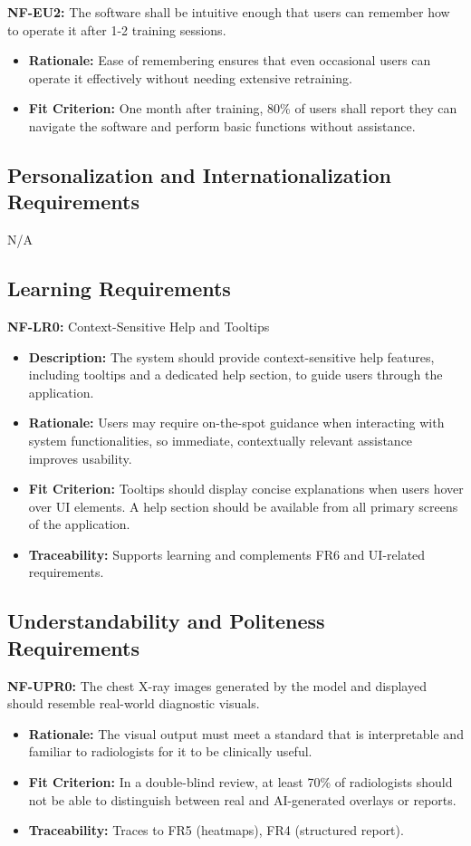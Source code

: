\documentclass[12pt]{article}
\begin{document}
\textbf{NF-EU2:} The software shall be intuitive enough that users can remember how to operate it after 1-2 training sessions.
\begin{itemize}
    \item \textbf{Rationale:} Ease of remembering ensures that even occasional users can operate it effectively without needing extensive retraining.
    \item \textbf{Fit Criterion:} One month after training, 80\% of users shall report they can navigate the software and perform basic functions without assistance.
\end{itemize}

\subsection{Personalization and Internationalization Requirements}
N/A

\subsection{Learning Requirements}

\textbf{NF-LR0:} Context-Sensitive Help and Tooltips
\begin{itemize}
    \item \textbf{Description:} The system should provide context-sensitive help features, including tooltips and a dedicated help section, to guide users through the application.
    \item \textbf{Rationale:} Users may require on-the-spot guidance when interacting with system functionalities, so immediate, contextually relevant assistance improves usability.
    \item \textbf{Fit Criterion:} Tooltips should display concise explanations when users hover over UI elements. A help section should be available from all primary screens of the application.
    \item \textbf{Traceability:} Supports learning and complements FR6 and UI-related requirements.
\end{itemize}

\subsection{Understandability and Politeness Requirements}

\textbf{NF-UPR0:} The chest X-ray images generated by the model and displayed should resemble real-world diagnostic visuals.
\begin{itemize}
    \item \textbf{Rationale:} The visual output must meet a standard that is interpretable and familiar to radiologists for it to be clinically useful.
    \item \textbf{Fit Criterion:} In a double-blind review, at least 70\% of radiologists should not be able to distinguish between real and AI-generated overlays or reports.
    \item \textbf{Traceability:} Traces to FR5 (heatmaps), FR4 (structured report).
\end{itemize}
\end{document}
